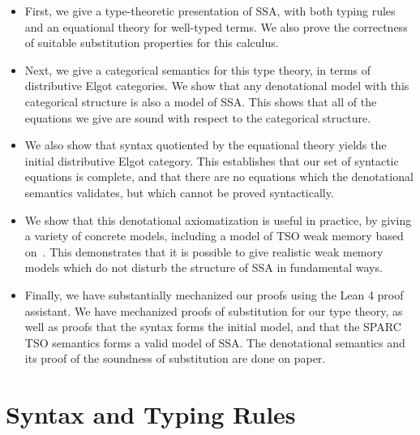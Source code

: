 \documentclass[acmsmall,screen,review]{acmart}
\begin{document}
\begin{itemize}
\item First, we give a type-theoretic presentation of SSA, with both typing rules and an equational
  theory for well-typed terms. We also prove the correctness of suitable substitution properties for
  this calculus. 
  
\item Next, we give a categorical semantics for this type theory, in terms of distributive Elgot
  categories. We show that any denotational model with this categorical structure is also a model of
  SSA. This shows that all of the equations we give are sound with respect to the categorical
  structure. 

\item We also show that syntax quotiented by the equational theory yields the initial distributive
  Elgot category. This establishes that our set of syntactic equations is complete, and that there
  are no equations which the denotational semantics validates, but which cannot be proved
  syntactically. 

\item We show that this denotational axiomatization is useful in practice, by giving a variety of
  concrete models, including a model of TSO weak memory based on~\cite{sparky}. This demonstrates
  that it is possible to give realistic weak memory models which do not disturb the structure of SSA
  in fundamental ways.

\item Finally, we have substantially mechanized our proofs using the Lean 4 proof assistant. We have
  mechanized proofs of substitution for our type theory, as well as proofs that the syntax forms the
  initial model, and that the SPARC TSO semantics forms a valid model of SSA. The denotational
  semantics and its proof of the soundness of substitution are done on paper. 

\end{itemize}




\clearpage 

\appendix

\section{Syntax and Typing Rules}
\end{document}
